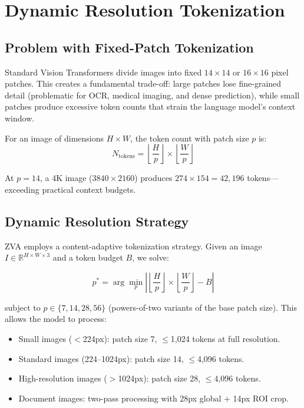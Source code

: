 \documentclass[11pt,a4paper]{article}
\begin{document}
\section{Dynamic Resolution Tokenization}

\subsection{Problem with Fixed-Patch Tokenization}

Standard Vision Transformers divide images into fixed $14 \times 14$ or $16 \times 16$ pixel patches. This creates a fundamental trade-off: large patches lose fine-grained detail (problematic for OCR, medical imaging, and dense prediction), while small patches produce excessive token counts that strain the language model's context window.

For an image of dimensions $H \times W$, the token count with patch size $p$ is:
\begin{equation}
N_{\text{tokens}} = \left\lfloor\frac{H}{p}\right\rfloor \times \left\lfloor\frac{W}{p}\right\rfloor
\end{equation}

At $p=14$, a 4K image ($3840 \times 2160$) produces $274 \times 154 = 42,196$ tokens—exceeding practical context budgets.

\subsection{Dynamic Resolution Strategy}

ZVA employs a content-adaptive tokenization strategy. Given an image $I \in \mathbb{R}^{H \times W \times 3}$ and a token budget $B$, we solve:

\begin{equation}
p^* = \arg\min_p \left| \left\lfloor\frac{H}{p}\right\rfloor \times \left\lfloor\frac{W}{p}\right\rfloor - B \right|
\end{equation}

subject to $p \in \{7, 14, 28, 56\}$ (powers-of-two variants of the base patch size). This allows the model to process:
\begin{itemize}
  \item Small images ($<$224px): patch size 7, $\leq$1,024 tokens at full resolution.
  \item Standard images (224--1024px): patch size 14, $\leq$4,096 tokens.
  \item High-resolution images ($>$1024px): patch size 28, $\leq$4,096 tokens.
  \item Document images: two-pass processing with 28px global + 14px ROI crop.
\end{itemize}
\end{document}
